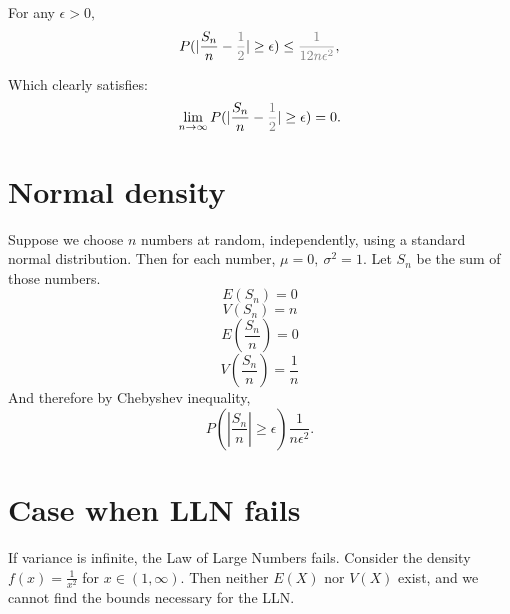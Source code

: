 \documentclass[english]{svjour3modified}
\begin{document}
\noindent For any \large $\epsilon>0,$ $$P(|\frac{S_n}{n}-\textcolor{black!50}{\frac{1}{2}} |\geq \epsilon)\leq \textcolor{black!50}{\frac{1}{12n\epsilon^2}},$$\vfill

\normalsize \noindent Which clearly satisfies: \large $$\lim_{n\rightarrow\infty}P(|\frac{S_n}{n}-\textcolor{black!50}{\frac{1}{2}}|\geq \epsilon)=0.$$\vfill

\pagebreak
\section{Normal density} 

Suppose we choose $n$ numbers at random, independently, using a standard normal distribution. Then for each number, $\mu=0,\ \sigma^2=1.$ Let $S_n$ be the sum of those numbers. $$E(S_n)=0$$ $$V(S_n)=n$$ $$E(\frac{S_n}{n})=0$$ $$V(\frac{S_n}{n})=\frac{1}{n}$$ And therefore by Chebyshev inequality, $$P(|\frac{S_n}{n}|\geq \epsilon)\frac{1}{n\epsilon^2}.$$

\section{Case when LLN fails}

If variance is infinite, the Law of Large Numbers fails. Consider the density $f(x)=\frac{1}{x^2}$ for $x\in(1,\infty)$. Then neither $E(X)$ nor $V(X)$ exist, and we cannot find the bounds necessary for the LLN.
\end{document}
